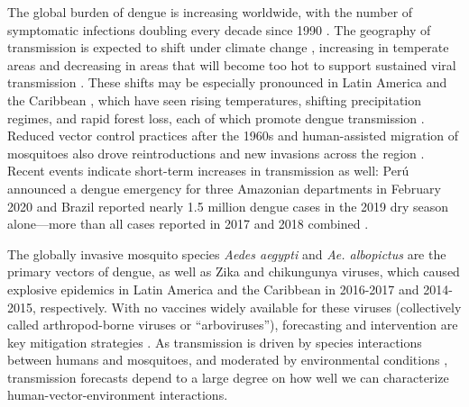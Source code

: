 The global burden of dengue is increasing worldwide, with the number of symptomatic infections doubling every decade since 1990 \cite{Stanaway2016-mo}. The geography of transmission is expected to shift under climate change \cite{Bhatt2013-qa, Campbell2015-ky}, increasing in temperate areas and decreasing in areas that will become too hot to support sustained viral transmission \cite{Mordecai2019-ya, Ryan2019-pz}. These shifts may be especially pronounced in Latin America and the Caribbean \cite{Shepard2011-nz, Tapia-Conyer2012-yw}, which have seen rising temperatures, shifting precipitation regimes, and rapid forest loss, each of which promote dengue transmission \cite{Locatelli2011-de, Marengo2011-jk, Collins2013-zo, Nobre2016-jn}. Reduced vector control practices after the 1960s \cite{Gubler2002-af, Gomez-Dantes2009-iu} and human-assisted migration of mosquitoes also drove reintroductions and new invasions across the region \cite{Knudsen1995-pc, Rossi1999-sr, Tatem2006-qu, Ortega-Morales2016-jd}. Recent events indicate short-term increases in transmission as well: Perú announced a dengue emergency for three Amazonian departments in February 2020 \cite{Ministerio_de_Salud_Peru2020-pb, US_Embassy_Lima2020-gd} and Brazil reported nearly 1.5 million dengue cases in the 2019 dry season alone—more than all cases reported in 2017 and 2018 combined \cite{Brazil2019-xb, Pan_American_Health_Organization_World_Health_Organization2020-ov}.

The globally invasive mosquito species \textit{Aedes aegypti} and \textit{Ae. albopictus} are the primary vectors of dengue, as well as Zika and chikungunya viruses, which caused explosive epidemics in Latin America and the Caribbean in 2016-2017 and 2014-2015, respectively. With no vaccines widely available for these viruses (collectively called arthropod-borne viruses or “arboviruses”), forecasting and intervention are key mitigation strategies \cite{Tapia-Conyer2012-yw, Altizer2013-dn, Castro2019-jb}. As transmission is driven by species interactions between humans and mosquitoes, and moderated by environmental conditions \cite{Hopp2001-zf, Paaijmans2013-dg, Mordecai2019-ya}, transmission forecasts depend to a large degree on how well we can characterize human-vector-environment interactions.

